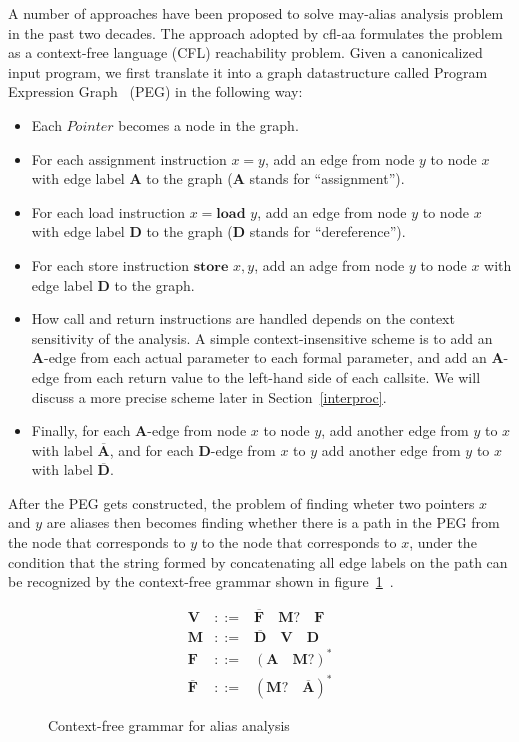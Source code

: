 \documentclass[10pt]{article}
\begin{document}
A number of approaches have been proposed to solve may-alias analysis problem in
the past two decades. The approach adopted by cfl-aa formulates the problem as a context-free
language (CFL) reachability problem. Given a canonicalized input program, we
first translate it into a graph datastructure called Program Expression
Graph~\cite{Reps:1997} (PEG) in the following way:
\begin{itemize}
  \item Each $Pointer$ becomes a node in the graph.
  \item For each assignment instruction $x = y$, add an edge from node $y$ to node $x$
    with edge label \textbf{A} to the graph (\textbf{A} stands for ``assignment'').
  \item For each load instruction $x = \textbf{load }y$, add an edge from node $y$ to
    node $x$ with edge label \textbf{D} to the graph (\textbf{D} stands for ``dereference'').
  \item For each store instruction $\textbf{store } x, y$, add an adge from node
    $y$ to node $x$ with edge label \textbf{D} to the graph.
  \item How call and return instructions are handled depends on the
    context sensitivity of the analysis. A simple context-insensitive scheme is
    to add an \textbf{A}-edge from each actual parameter to each formal
    parameter, and add an \textbf{A}-edge from each return value to the
    left-hand side of each callsite. We will discuss a more precise scheme later in Section~\ref{interproc}.
  \item Finally, for each \textbf{A}-edge from node $x$ to node $y$, add another edge from
    $y$ to $x$ with label $\overline{\textbf{A}}$, and for each \textbf{D}-edge from
    $x$ to $y$ add another edge from $y$ to $x$ with label $\overline{\textbf{D}}$.
\end{itemize}

After the PEG gets constructed, the problem of finding wheter two pointers $x$
and $y$ are aliases then becomes finding whether there is a path in the PEG from
the node that corresponds to $y$ to the node that corresponds to $x$, under the
condition that the string formed by concatenating all edge labels on the path can be
recognized by the context-free grammar shown in figure~\ref{fig:grammar}~\cite{Zheng:2008}.

\begin{figure}[!ht]
  \begin{eqnarray*}
    \textbf{V} & ::= & \overline{\textbf{F}}\quad\textbf{M}?\quad\textbf{F} \\
    \textbf{M} & ::= & \overline{\textbf{D}}\quad\textbf{V}\quad\textbf{D} \\
    \textbf{F} & ::= & {(\textbf{A}\quad\textbf{M}?)}^{*} \\
    \overline{\textbf{F}} & ::= & {(\textbf{M}?\quad\overline{\textbf{A}})}^{*}
  \end{eqnarray*}
  \caption{Context-free grammar for alias analysis\label{fig:grammar}}
\end{figure}
\end{document}
